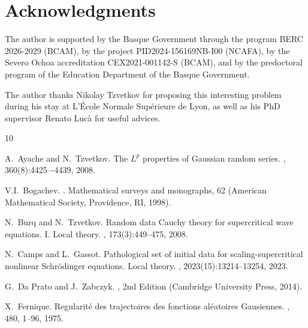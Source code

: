 \documentclass[a4paper, reqno, 11pt]{amsart}
\theoremstyle{definition}
\begin{document}
\section*{Acknowledgments}
	The author is supported by the Basque Government through the program BERC 2026-2029 (BCAM), by the project PID2024-156169NB-I00 (NCAFA), by the Severo Ochoa accreditation CEX2021-001142-S (BCAM), and by the predoctoral program of the Education Department of the Basque Government.
	
	The author thanks Nikolay Tzvetkov for proposing this interesting problem during his stay at L'École Normale Supérieure de Lyon, as well as his PhD supervisor Renato Lucà for useful advices.

	
	
		\begin{thebibliography}{10}
	
		A.~Ayache and N.~Tzvetkov.
		\newblock The $L^p$ properties of Gaussian random series.
		, 360(8):4425–-4439, 2008.

		
		
		
		V.I.~Bogachev.
		.
		\newblock Mathematical surveys and monographs, 62 (American Mathematical Society, Providence, RI, 1998).
    	
		N.~Burq and N.~Tzvetkov.
		\newblock Random data {C}auchy theory for supercritical wave equations. {I}.
		{L}ocal theory.
		, 173(3):449--475, 2008.
		
		N.~Camps and L.~Gassot.
		\newblock Pathological set of initial data for scaling-supercritical nonlinear Schrödinger equations.
		{L}ocal theory.
		, 2023(15):13214--13254, 2023.
		
		G.~Da Prato and J.~Zabczyk.
		, 				2nd Edition (Cambridge University Press, 2014).
		
		X.~Fernique.
		\newblock Regularité des trajectoires des fonctions aléatoires Gausiennes.
		, 480, 1--96, 1975.
		

\end{thebibliography}
\end{document}
